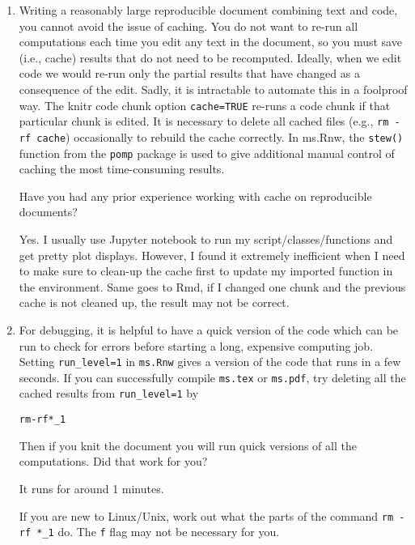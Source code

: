 \documentclass[12pt]{article}\usepackage[]{graphicx}\usepackage[]{color}
\makeatletter
\newenvironment{kframe}{%
 \def\at@end@of@kframe{}%
 \ifinner\ifhmode%
  \def\at@end@of@kframe{\end{minipage}}%
  \begin{minipage}{\columnwidth}%
 \fi\fi%
 \def\FrameCommand##1{\hskip\@totalleftmargin \hskip-\fboxsep
 \colorbox{shadecolor}{##1}\hskip-\fboxsep
     \hskip-\linewidth \hskip-\@totalleftmargin \hskip\columnwidth}%
 \MakeFramed {\advance\hsize-\width
   \@totalleftmargin\z@ \linewidth\hsize
   \@setminipage}}%
 {\par\unskip\endMakeFramed%
 \at@end@of@kframe}
\newenvironment{knitrout}{}{} %
\makeatother
\begin{document}
\begin{enumerate}
\item Writing a reasonably large reproducible document combining text and code, you cannot avoid the issue of caching. You do not want to re-run all computations each time you edit any text in the document, so you must save (i.e., cache) results that do not need to be recomputed. Ideally, when we edit code we would re-run only the partial results that have changed as a consequence of the edit. Sadly, it is intractable to automate this in a foolproof way. The knitr code chunk option \texttt{cache=TRUE} re-runs a code chunk if that particular chunk is edited. It is necessary to delete all cached files (e.g., \texttt{rm -rf cache}) occasionally to rebuild the cache correctly. In ms.Rnw, the \texttt{stew()} function from the \texttt{pomp} package is used to give additional manual control of caching the most time-consuming results.

Have you had any prior experience working with cache on reproducible documents?

Yes. I usually use Jupyter notebook to run my script/classes/functions and get pretty plot displays. However, I found it extremely inefficient when I need to make sure to clean-up the cache first to update my imported function in the environment. Same goes to Rmd, if I changed one chunk and the previous cache is not cleaned up, the result may not be correct.

\item For debugging, it is helpful to have a quick version of the code which can be run to check for errors before starting a long, expensive computing job. Setting \texttt{run\_level=1} in \texttt{ms.Rnw} gives a version of the code that runs in a few seconds. If you can successfully compile \texttt{ms.tex} or \texttt{ms.pdf}, try deleting all the cached results from \texttt{run\_level=1} by
\begin{knitrout}
\color{fgcolor}\begin{kframe}
\begin{alltt}
rm -rf *_1
\end{alltt}
\end{kframe}
\end{knitrout}
Then if you knit the document you will run quick versions of all the computations. Did that work for you?

It runs for around 1 minutes.

If you are new to Linux/Unix, work out what the parts of the command \texttt{rm -rf *\_1} do. The \texttt{f} flag may not be necessary for you.


\end{enumerate}
\end{document}
